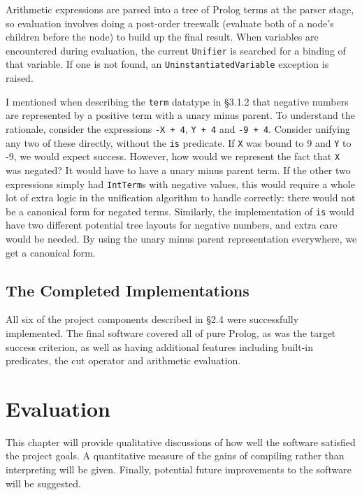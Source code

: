 \documentclass[12pt]{article}
\begin{document}
Arithmetic expressions are parsed into a tree of Prolog terms at the parser stage, so evaluation involves doing a post-order treewalk (evaluate both of a node's children before the node) to build up the final result.
When variables are encountered during evaluation, the current \verb|Unifier| is searched for a binding of that variable.
If one is not found, an \verb|UninstantiatedVariable| exception is raised. 

I mentioned when describing the \verb|term| datatype in \S3.1.2 that negative numbers are represented by a positive term with a unary minus parent.
To understand the rationale, consider the expressions \verb|-X + 4|, \verb|Y + 4| and \verb|-9 + 4|. 
Consider unifying any two of these directly, without the \verb|is| predicate. 
If \verb|X| was bound to 9 and \verb|Y| to -9, we would expect success. 
However, how would we represent the fact that \verb|X| was negated?
It would have to have a unary minus parent term.
If the other two expressions simply had \verb|IntTerm|s with negative values, this would require a whole lot of extra logic in the unification algorithm to handle correctly: there would not be a canonical form for negated terms.
Similarly, the implementation of \verb|is| would have two different potential tree layouts for negative numbers, and extra care would be needed.
By using the unary minus parent representation everywhere, we get a canonical form.

\subsection{The Completed Implementations}

All six of the project components described in \S2.4 were successfully implemented. The final software covered all of pure Prolog, as was the target success criterion, as well as having additional features including built-in predicates, the cut operator and arithmetic evaluation.

\newpage

\section{Evaluation}


This chapter will provide qualitative discussions of how well the software satisfied the project goals. A quantitative measure of the gains of compiling rather than interpreting will be given. Finally, potential future improvements to the software will be suggested.
\end{document}
